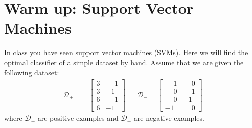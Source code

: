 \section{Warm up: Support Vector Machines}
\label{sec:svm}

In class you have seen support vector machines (SVMs).  Here we will find the optimal classifier of a simple dataset by hand.  Assume that we are given the following dataset:
\begin{align*}
\mathcal{D}_+ &= \begin{bmatrix}
  3 & \phantom{-}1\\
  3 & -1\\
  6 & \phantom{-}1\\
  6 & -1
\end{bmatrix}
&& \mathcal{D}_-= \begin{bmatrix}
  \phantom{-}1 & \phantom{-}0\\
  \phantom{-}0 & \phantom{-}1\\
  \phantom{-}0 & -1\\
  -1 & \phantom{-}0
\end{bmatrix}
\end{align*}
where $\mathcal{D}_+$ are positive examples and $\mathcal{D}_-$ are negative examples.
